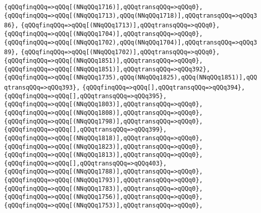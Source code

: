 \verb|{qQQqfinqQQq=>qQQq[(NNqQQq1716)],qQQqtransqQQq=>qQQq0},|\newline
\verb|{qQQqfinqQQq=>qQQq[(NNqQQq1713),qQQq(NNqQQq1718)],qQQqtransqQQq=>qQQq386},|\newline
\verb|{qQQqfinqQQq=>qQQq[(NNqQQq1713)],qQQqtransqQQq=>qQQq0},|\newline
\verb|{qQQqfinqQQq=>qQQq[(NNqQQq1704)],qQQqtransqQQq=>qQQq0},|\newline
\verb|{qQQqfinqQQq=>qQQq[(NNqQQq1702),qQQq(NNqQQq1704)],qQQqtransqQQq=>qQQq389},|\newline
\verb|{qQQqfinqQQq=>qQQq[(NNqQQq1702)],qQQqtransqQQq=>qQQq0},|\newline
\verb|{qQQqfinqQQq=>qQQq[(NNqQQq1851)],qQQqtransqQQq=>qQQq0},|\newline
\verb|{qQQqfinqQQq=>qQQq[(NNqQQq1851)],qQQqtransqQQq=>qQQq392},|\newline
\verb|{qQQqfinqQQq=>qQQq[(NNqQQq1735),qQQq(NNqQQq1825),qQQq(NNqQQq1851)],qQQqtransqQQq=>qQQq393},|\newline
\verb|{qQQqfinqQQq=>qQQq[],qQQqtransqQQq=>qQQq394},|\newline
\verb|{qQQqfinqQQq=>qQQq[],qQQqtransqQQq=>qQQq395},|\newline
\verb|{qQQqfinqQQq=>qQQq[(NNqQQq1803)],qQQqtransqQQq=>qQQq0},|\newline
\verb|{qQQqfinqQQq=>qQQq[(NNqQQq1808)],qQQqtransqQQq=>qQQq0},|\newline
\verb|{qQQqfinqQQq=>qQQq[(NNqQQq1798)],qQQqtransqQQq=>qQQq0},|\newline
\verb|{qQQqfinqQQq=>qQQq[],qQQqtransqQQq=>qQQq399},|\newline
\verb|{qQQqfinqQQq=>qQQq[(NNqQQq1818)],qQQqtransqQQq=>qQQq0},|\newline
\verb|{qQQqfinqQQq=>qQQq[(NNqQQq1823)],qQQqtransqQQq=>qQQq0},|\newline
\verb|{qQQqfinqQQq=>qQQq[(NNqQQq1813)],qQQqtransqQQq=>qQQq0},|\newline
\verb|{qQQqfinqQQq=>qQQq[],qQQqtransqQQq=>qQQq403},|\newline
\verb|{qQQqfinqQQq=>qQQq[(NNqQQq1788)],qQQqtransqQQq=>qQQq0},|\newline
\verb|{qQQqfinqQQq=>qQQq[(NNqQQq1793)],qQQqtransqQQq=>qQQq0},|\newline
\verb|{qQQqfinqQQq=>qQQq[(NNqQQq1783)],qQQqtransqQQq=>qQQq0},|\newline
\verb|{qQQqfinqQQq=>qQQq[(NNqQQq1756)],qQQqtransqQQq=>qQQq0},|\newline
\verb|{qQQqfinqQQq=>qQQq[(NNqQQq1753)],qQQqtransqQQq=>qQQq0},|\newline
